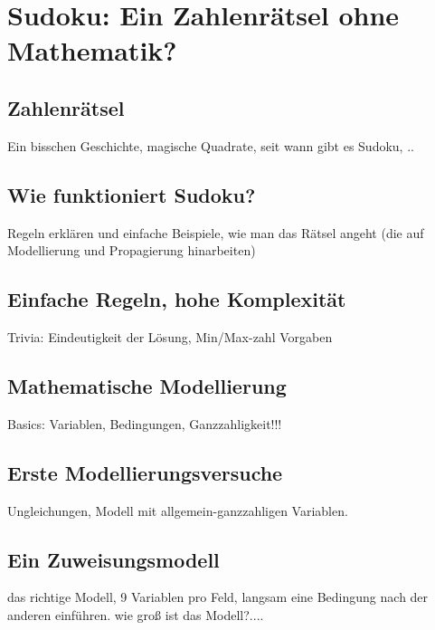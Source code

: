 \chapter{Sudoku: Ein Zahlenrätsel ohne Mathematik?}
\label{chap_sudoku}

\section{Zahlenrätsel}
Ein bisschen Geschichte, magische Quadrate, seit wann gibt es Sudoku, ..

\section{Wie funktioniert Sudoku?}
Regeln erklären und einfache Beispiele, wie man das Rätsel angeht (die
auf Modellierung und Propagierung hinarbeiten)

\section{Einfache Regeln, hohe Komplexität}
Trivia: Eindeutigkeit der Lösung, Min/Max-zahl  Vorgaben

\section{Mathematische Modellierung}
Basics: Variablen, Bedingungen, Ganzzahligkeit!!!

\section{Erste Modellierungsversuche}
Ungleichungen, Modell mit allgemein-ganzzahligen Variablen.

\section{Ein Zuweisungsmodell}
das richtige Modell, 9 Variablen pro Feld, langsam eine Bedingung nach
der anderen einführen. wie groß ist das Modell?....


